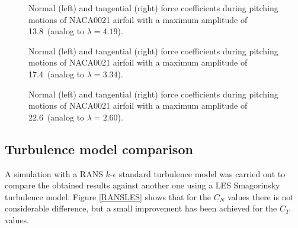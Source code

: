 \documentclass[a4paper]{jpconf}
\begin{document}
\begin{figure}[h]
\begin{minipage}{18pc}
\resizebox{\columnwidth}{!}{}
\end{minipage}\hspace{2pc}%
\begin{minipage}{18pc}
\resizebox{\columnwidth}{!}{}
\end{minipage}
\caption{\label{fig138}Normal (left) and tangential (right) force coefficients during pitching motions of NACA0021 airfoil with a maximum amplitude of 13.8\degree\ (analog to $\lambda = 4.19$).}
\end{figure}


\begin{figure}[h]
\begin{minipage}{18pc}
\resizebox{\columnwidth}{!}{}
\end{minipage}\hspace{2pc}%
\begin{minipage}{18pc}
\resizebox{\columnwidth}{!}{}
\end{minipage}
\caption{\label{fig174}Normal (left) and tangential (right) force coefficients during pitching motions of NACA0021 airfoil with a maximum amplitude of 17.4\degree\ (analog to $\lambda = 3.34$).}
\end{figure}

\begin{figure}[h]
\begin{minipage}{18pc}
\resizebox{\columnwidth}{!}{}
\end{minipage}\hspace{2pc}%
\begin{minipage}{18pc}
\resizebox{\columnwidth}{!}{}
\end{minipage}
\caption{\label{fig226}Normal (left) and tangential (right) force coefficients during pitching motions of NACA0021 airfoil with a maximum amplitude of 22.6\degree\ (analog to $\lambda = 2.60$).}
\end{figure}

\subsection{Turbulence model comparison}
A simulation with a RANS $k$-$\epsilon$ standard turbulence model was carried out to compare the obtained results against another one using a LES Smagorinsky turbulence model. Figure \ref{RANSLES} shows that for the $C_N$ values there is not considerable difference, but a small improvement has been achieved for the $C_T$ values.
\end{document}
